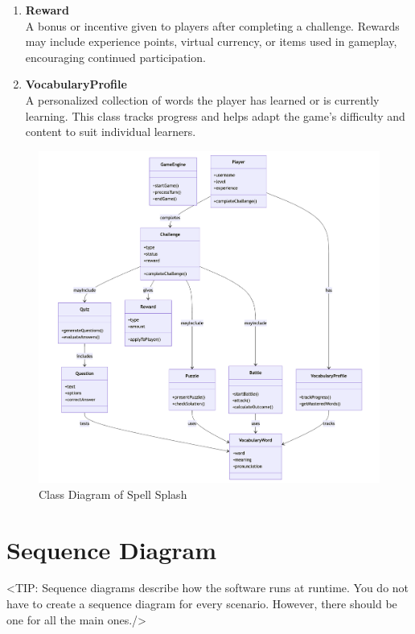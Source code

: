 \begin{enumerate}
    \item \textbf{Reward}\\
    A bonus or incentive given to players after completing a challenge. 
    Rewards may include experience points, virtual currency, or items used in gameplay, encouraging continued participation.

    \item \textbf{VocabularyProfile}\\
    A personalized collection of words the player has learned or is currently learning. 
    This class tracks progress and helps adapt the game’s difficulty and content to suit individual learners.
\end{enumerate}

\clearpage

\begin{figure}[H]
    \centering
    \includegraphics[width=1\textwidth]{assets/ku/class_diagram.png}
    \caption{Class Diagram of Spell Splash}
    \label{fig:design-class-diagram}
\end{figure}

\section{Sequence Diagram}
\label{section:sequence-diagram}
<TIP: Sequence diagrams describe how the software runs at runtime.
You do not have to create a sequence diagram for every scenario. However,
there should be one for all the main ones./>

